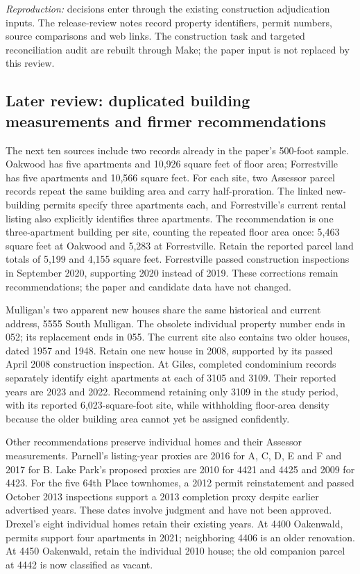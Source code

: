 \textit{Reproduction:} decisions enter through the existing construction adjudication inputs. The release-review notes record property identifiers, permit numbers, source comparisons and web links. The construction task and targeted reconciliation audit are rebuilt through Make; the paper input is not replaced by this review.


\subsection*{Later review: duplicated building measurements and firmer recommendations}
The next ten sources include two records already in the paper's 500-foot sample. Oakwood has five apartments and 10,926 square feet of floor area; Forrestville has five apartments and 10,566 square feet. For each site, two Assessor parcel records repeat the same building area and carry half-proration. The linked new-building permits specify three apartments each, and Forrestville's current rental listing also explicitly identifies three apartments. The recommendation is one three-apartment building per site, counting the repeated floor area once: 5,463 square feet at Oakwood and 5,283 at Forrestville. Retain the reported parcel land totals of 5,199 and 4,155 square feet. Forrestville passed construction inspections in September 2020, supporting 2020 instead of 2019. These corrections remain recommendations; the paper and candidate data have not changed.

Mulligan's two apparent new houses share the same historical and current address, 5555 South Mulligan. The obsolete individual property number ends in 052; its replacement ends in 055. The current site also contains two older houses, dated 1957 and 1948. Retain one new house in 2008, supported by its passed April 2008 construction inspection. At Giles, completed condominium records separately identify eight apartments at each of 3105 and 3109. Their reported years are 2023 and 2022. Recommend retaining only 3109 in the study period, with its reported 6,023-square-foot site, while withholding floor-area density because the older building area cannot yet be assigned confidently.

Other recommendations preserve individual homes and their Assessor measurements. Parnell's listing-year proxies are 2016 for A, C, D, E and F and 2017 for B. Lake Park's proposed proxies are 2010 for 4421 and 4425 and 2009 for 4423. For the five 64th Place townhomes, a 2012 permit reinstatement and passed October 2013 inspections support a 2013 completion proxy despite earlier advertised years. These dates involve judgment and have not been approved. Drexel's eight individual homes retain their existing years. At 4400 Oakenwald, permits support four apartments in 2021; neighboring 4406 is an older renovation. At 4450 Oakenwald, retain the individual 2010 house; the old companion parcel at 4442 is now classified as vacant.

